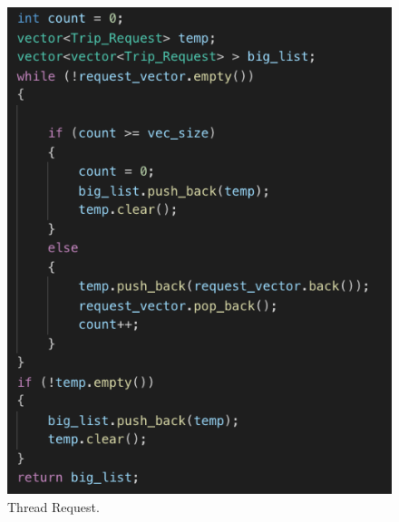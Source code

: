 \documentclass[English]{article}
\theoremstyle{remark}
\numberwithin{equation}{section}
\begin{document}
\begin{figure}[!tbp]
  \centering
  \begin{minipage}[b]{0.4\textwidth}
    \includegraphics[width=\textwidth]{code1.png}
    \caption{Thread Request.}
  \end{minipage}
  \hfill
  \begin{minipage}[b]{0.4\textwidth}

\end{minipage}
\end{figure}
\end{document}
